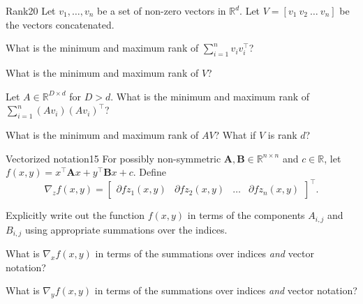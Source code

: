 \documentclass{article}
\begin{document}
\begin{problem}{Rank}{20}
 Let $v_1,\ldots,v_n$ be a set of non-zero vectors in $\mathbb{R}^d$. Let $V =[{v_1  \ v_2 \ \dots \ v_n}]$ be the vectors concatenated. 
 
         What is the minimum and maximum rank of $\sum_{i=1}^n v_i v_i^\top$?
        
         What is the minimum and maximum rank of $V$?
        
          Let $A \in \mathbb{R}^{D \times d}$ for $D > d$. What is the minimum and maximum rank of $\sum_{i=1}^n (A v_i) (A v_i)^\top$?
        
          What is the minimum and maximum rank of $AV$? What if $V$ is rank $d$?

\end{problem}


\begin{problem}{Vectorized notation}{15}
For possibly non-symmetric $\bm{A}, \bm{B} \in \mathbb{R}^{n \times n}$ and $c \in \mathbb{R}$, let $f(x, y) = x^\top \bm{A} x + y^\top \bm{B} x + c$. Define
    $$\nabla_z f(x,y) = \begin{bmatrix}
        \partial{f}{z_1}(x,y) & \partial{f}{z_2}(x,y) & \dots & \partial{f}{z_n}(x,y)
    \end{bmatrix}^\top.$$  
    
    	  Explicitly write out the function $f(x, y)$ in terms of the components $A_{i,j}$ and $B_{i,j}$ using appropriate summations over the indices. 
	
    	  What is $\nabla_x f(x,y)$ in terms of the summations over indices \emph{and} vector notation?
	
    	 What is $\nabla_y f(x,y)$ in terms of the summations over indices \emph{and} vector notation?


\end{problem}
\end{document}
